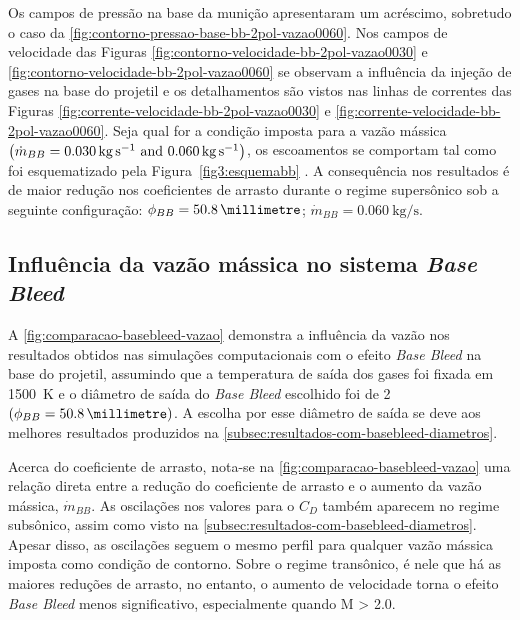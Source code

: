 Os campos de pressão na base da munição apresentaram um acréscimo, sobretudo o caso da \autoref{fig:contorno-pressao-base-bb-2pol-vazao0060}. Nos campos de velocidade das Figuras \ref{fig:contorno-velocidade-bb-2pol-vazao0030} e \ref{fig:contorno-velocidade-bb-2pol-vazao0060} se observam a influência da injeção de gases na base do projetil e os detalhamentos são vistos nas linhas de correntes das Figuras \ref{fig:corrente-velocidade-bb-2pol-vazao0030} e \ref{fig:corrente-velocidade-bb-2pol-vazao0060}. Seja qual for a condição imposta para a vazão mássica \(\left(\Dot{m}_{BB} = \qtylist{0,030;0,060}{\kilogram\per\second}\right)\), os escoamentos se comportam tal como foi esquematizado pela Figura~\ref{fig3:esquemabb} \cite{Mathur&Dutton1996}. A consequência nos resultados é de maior redução nos coeficientes de arrasto durante o regime supersônico sob a seguinte configuração: \(\phi_{BB} = \qty{50,8}{\millimetre}\); \(\Dot{m}_{BB} = \qty{0,060}{\kilogram\per\second}\).

\subsection{Influência da vazão mássica no sistema \textit{Base Bleed}} \label{subsec:resultados-com-basebleed-vazao}

A \autoref{fig:comparacao-basebleed-vazao} demonstra a influência da vazão nos resultados obtidos nas simulações computacionais com o efeito \textit{Base Bleed} na base do projetil, assumindo que a temperatura de saída dos gases foi fixada em \qty{1500}{\kelvin} \cite{RosendoCILAMCE2022} e o diâmetro de saída do \textit{Base Bleed} escolhido foi de \qty{2}{\polegada} \(\left(\phi_{BB} = \qty{50,8}{\millimetre}\right)\). A escolha por esse diâmetro de saída se deve aos melhores resultados produzidos na \autoref{subsec:resultados-com-basebleed-diametros}.

Acerca do coeficiente de arrasto, nota-se na \autoref{fig:comparacao-basebleed-vazao} uma relação direta entre a redução do coeficiente de arrasto e o aumento da vazão mássica, \(\Dot{m}_{BB}\). As oscilações nos valores para o \(C_{D}\) também aparecem no regime subsônico, assim como visto na \autoref{subsec:resultados-com-basebleed-diametros}. Apesar disso, as oscilações seguem o mesmo perfil para qualquer vazão mássica imposta como condição de contorno. Sobre o regime transônico, é nele que há as maiores reduções de arrasto, no entanto, o aumento de velocidade torna o efeito \textit{Base Bleed} menos significativo, especialmente quando M > \num{2,0}.

